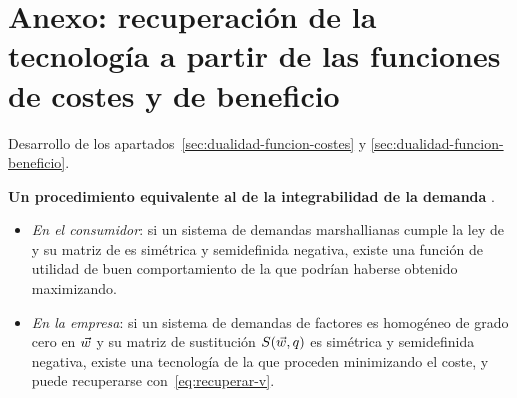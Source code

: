 \documentclass[11pt]{article}
\begin{document}
\begin{landscape}
\begin{infografia}[H]
\centering
\caption{Esquema completo de la dualidad en la producción: el primal de , la minimización del coste y la maximización del beneficio}\label{figu:esquema-dualidad-segura}
\end{infografia}
\end{landscape}

\section{Anexo: recuperación de la tecnología\cortetitulo{} a partir de las funciones de costes y de beneficio}\label{anexo:recuperacion}

Desarrollo de los apartados~\ref{sec:dualidad-funcion-costes} y \ref{sec:dualidad-funcion-beneficio}.

\begin{anotaciones}
\textbf{Un procedimiento equivalente al de la integrabilidad de la demanda} .
\begin{itemize}
\item \emph{En el consumidor}: si un sistema de demandas marshallianas cumple la ley de  y su matriz de  es simétrica y semidefinida negativa, existe una función de utilidad de buen comportamiento de la que podrían haberse obtenido maximizando.
\item \emph{En la empresa}: si un sistema de demandas de factores es homogéneo de grado cero en $\vec{w}$ y su matriz de sustitución $S(\vec{w},q)$ es simétrica y semidefinida negativa, existe una tecnología de la que proceden minimizando el coste, y puede recuperarse con~\eqref{eq:recuperar-v}.
\end{itemize}
\end{anotaciones}
\end{document}
